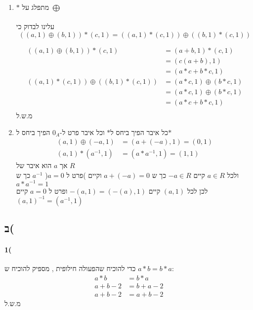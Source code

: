 \documentclass{article}
\begin{document}
\begin{enumerate}
  \item $*$ מתפלג על $\bigoplus$\\
    \\
    עלינו לבדוק כי
    \begin{equation}
      ((a,1)\oplus(b,1))*(c,1) = ((a,1)*(c,1)) \oplus ((b,1)*(c,1))
    \end{equation}

    \begin{align*}
      ((a,1)\oplus(b,1))*(c,1) &= (a+b, 1)*(c,1)\\
      &= (c(a+b), 1)\\
      &= (a*c+b*c, 1)\\
      ((a,1)*(c,1)) \oplus ((b,1)*(c,1)) &= (a*c, 1) \oplus (b*c, 1)\\
      &= (a*c, 1) \oplus (b*c, 1)\\
      &= (a*c + b*c, 1)\\
    \end{align*}
    מ.ש.ל

  \clearpage
  \item כל איבר הפיך ביחס ל$*$ וכל איבר פרט ל-$0_A$ הפיך ביחס ל$*$
    \begin{align*}
      (a,1) \oplus (-a, 1) &= (a + (-a), 1) = (0,1)\\
      (a,1) * (a^{-1}, 1) &= (a*a^{-1}, 1) = (1,1)
    \end{align*}
    אך $a$ הוא איבר של $R$ \\
    ולכל $a \in R$ קיים $-a \in R$ כך ש $a + (-a) = 0$ וקיים )פרט ל $a=0$(  $a^{-1}$ כך ש $a*a^{-1} = 1$ \\
    לכן לכל $(a,1)$ קיים $-(a, 1) = (-(a), 1)$ ופרט ל $a=0$ קיים $(a, 1)^{-1} = (a^{-1}, 1)$
\end{enumerate}


\subsection{ב(}
  
\paragraph{1(}
כדי להוכיח שהפעולה חילופית , מספיק להוכיח ש $a*b=b*a$: 
\begin{align*}
  a*b &= b*a\\
  a+b-2 &= b+a-2\\
  a+b-2 &= a+b-2
\end{align*}
מ.ש.ל\\
\end{document}
